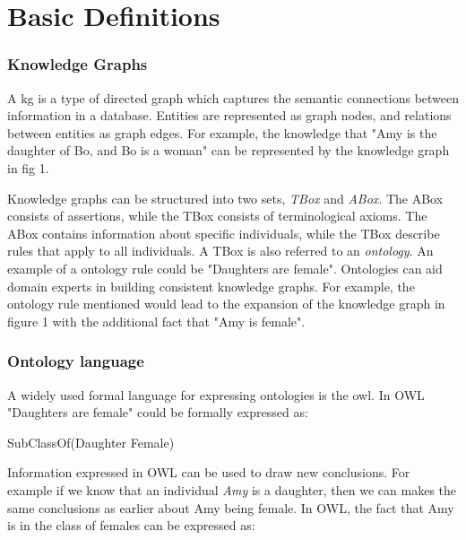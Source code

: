\chapter{Basic Definitions}


\subsection{Knowledge Graphs}
A \gls{kg} is a type of directed graph which captures the semantic connections between information in a database. Entities are represented as graph nodes, and relations between entities as graph edges. For example, the knowledge that "Amy is the daughter of Bo, and Bo is a woman" can be represented by the knowledge graph in fig 1.


 Knowledge graphs can be structured into two sets, \emph{TBox} and \emph{ABox}. The ABox consists of assertions, while the TBox consists of terminological axioms. The ABox contains information about specific individuals, while the TBox describe rules that apply to all individuals. A TBox is also referred to an \emph{ontology}. An example of a ontology rule could be "Daughters are female". Ontologies can aid domain experts in building consistent knowledge graphs. For example, the ontology rule mentioned would lead to the expansion of the knowledge graph in figure 1 with the additional fact that "Amy is female".

\subsection{Ontology language}
A widely used formal language for expressing ontologies is the \gls{owl}. In OWL "Daughters are female" could be formally expressed as:

\centerline{\textsf{SubClassOf(Daughter Female)}}
Information expressed in OWL can be used to draw new conclusions. For example if we know that an individual \emph{Amy} is a daughter, then we can makes the same conclusions as earlier about Amy being female. In OWL, the fact that Amy is in the class of females can be expressed as:

